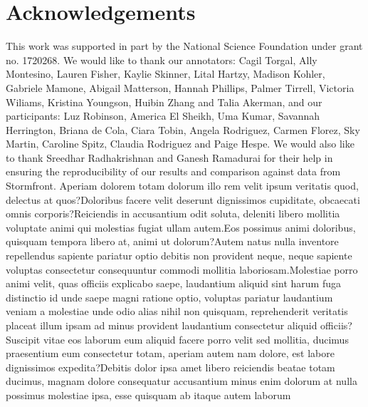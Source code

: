 \documentclass[letterpaper]{article} %
\begin{document}
\section{Acknowledgements}
This work was supported in part by the National Science Foundation under grant no. 1720268.
We would like to thank our annotators: Cagil Torgal,  Ally Montesino, Lauren Fisher, Kaylie Skinner, Lital Hartzy, Madison Kohler, Gabriele Mamone, Abigail Matterson, Hannah Phillips, Palmer Tirrell, Victoria Wiliams, Kristina Youngson, Huibin Zhang and Talia Akerman, and our participants: Luz Robinson, America El Sheikh, Uma Kumar, Savannah Herrington, Briana de Cola, Ciara Tobin, Angela Rodriguez, Carmen Florez, Sky Martin, Caroline Spitz, Claudia Rodriguez and Paige Hespe.
We would also like to thank Sreedhar Radhakrishnan and Ganesh Ramadurai for their help in ensuring the reproducibility of our results and comparison against data from Stormfront.  Aperiam dolorem totam dolorum illo rem velit ipsum veritatis quod, delectus at quos?Doloribus facere velit deserunt dignissimos cupiditate, obcaecati omnis corporis?Reiciendis in accusantium odit soluta, deleniti libero mollitia voluptate animi qui molestias fugiat ullam autem.Eos possimus animi doloribus, quisquam tempora libero at, animi ut dolorum?Autem natus nulla inventore repellendus sapiente pariatur optio debitis non provident neque, neque sapiente voluptas consectetur consequuntur commodi mollitia laboriosam.Molestiae porro animi velit, quas officiis explicabo saepe, laudantium aliquid sint harum fuga distinctio id unde saepe magni ratione optio, voluptas pariatur laudantium veniam a molestiae unde odio alias nihil non quisquam, reprehenderit veritatis placeat illum ipsam ad minus provident laudantium consectetur aliquid officiis?Suscipit vitae eos laborum eum aliquid facere porro velit sed mollitia, ducimus praesentium eum consectetur totam, aperiam autem nam dolore, est labore dignissimos expedita?Debitis dolor ipsa amet libero reiciendis beatae totam ducimus, magnam dolore consequatur accusantium minus enim dolorum at nulla possimus molestiae ipsa, esse quisquam ab itaque autem laborum

\end{document}
